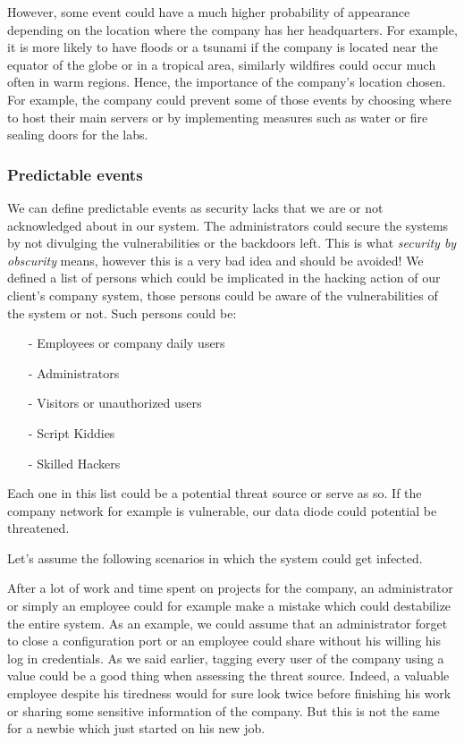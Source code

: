 \documentclass[a4paper,10pt]{article}
\begin{document}
However, some event could have a much higher probability of appearance depending on the location where the company has her headquarters. For example, it is more likely to have floods or a tsunami if the company is located near the equator of the globe or in a tropical area, similarly wildfires could occur much often in warm regions. Hence, the importance of the company's location chosen. For example, the company could prevent some of those events by choosing where to host their main servers or by implementing measures such as water or fire sealing doors for the labs.

\subsubsection{Predictable events}
We can define predictable events as security lacks that we are or not acknowledged about in our system. The administrators could secure the systems by not divulging the vulnerabilities or the backdoors left. This is what \emph{security by obscurity} means, however this is a very bad idea and should be avoided! We defined a list of persons which could be implicated in the hacking action of our client's company system, those persons could be aware of the vulnerabilities of the system or not. Such persons could be:
\begin{enumerate}
\item[-] Employees or company daily users
\item[-] Administrators
\item[-] Visitors or unauthorized users
\item[-] Script Kiddies
\item[-] Skilled Hackers
\end{enumerate}

Each one in this list could be a potential threat source or serve as so. If the company network for example is vulnerable, our data diode could potential be threatened.

Let's assume the following scenarios in which the system could get infected.

After a lot of work and time spent on projects for the company, an administrator or simply an employee could for example make a mistake which could destabilize the entire system. As an example, we could assume that an administrator forget to close a configuration port or an employee could share without his willing his log in credentials.
As we said earlier, tagging every user of the company using a value could be a good thing when assessing the threat source. Indeed, a valuable employee despite his tiredness would for sure look twice before finishing his work or sharing some sensitive information of the company. But this is not the same for a newbie which just started on his new job.
\end{document}
